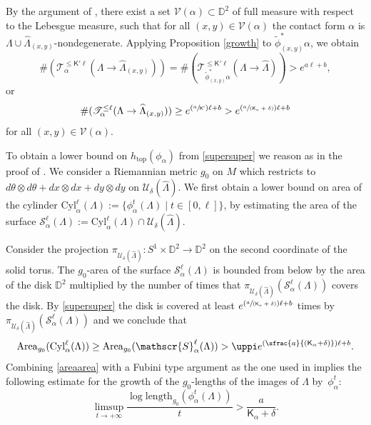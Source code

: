 \documentclass[10pt]{amsart}
\let\mathcal\mathscr
\let\ra\rightarrow
\newcommand{\length}{\mathrm{length}}
\renewcommand{\top}{\mathrm{top}}
\newcommand{\Pspfrac}[2]{(\sfrac{#1}{(#2)})}
\newcommand{\Psfrac}[2]{(\sfrac{#1}{#2})}
\theoremstyle{plain}
\theoremstyle{definition}
\numberwithin{equation}{subsection}
\begin{document}
By the argument of \cite[Lem.\,3]{Al}, there exist a set $\mathcal{V}(\alpha) \subset \mathbb{D}^2$ of full measure with respect to the Lebesgue measure, such that for all $(x,y) \in \mathcal{V}(\alpha)$ the contact form $\alpha$ is $\Lambda\cup\widehat{\Lambda}_{(x,y)}$-nondegenerate. Applying Proposition \ref{growth} to $\widetilde{\phi}_{(x,y)}^* \alpha$, we obtain
\begin{equation}
\#(\mathcal{T}^{\leq \mathsf{K}' \ell}_\alpha(\Lambda\ra \widehat{\Lambda}_{(x,y)})) = \#(\mathcal{T}^{\leq\mathsf{K}' \ell}_ {\widetilde{\phi}_{(x,y)}^*\alpha}(\Lambda\ra \widehat{\Lambda})) >e^{a\ell +b},
\end{equation}
or
\begin{equation} \label{supersuper}
\#(\mathcal{T}^{\leq \ell}_\alpha(\Lambda\ra \widehat{\Lambda}_{(x,y)})) \geq e^{\Psfrac{a}{\mathsf{K}'} \ell +b}> e^{\Pspfrac{a}{\mathsf{K}_{ \alpha} + \delta} \ell +b}
\end{equation}
for all $(x,y) \in \mathcal{V}(\alpha)$.

To obtain a lower bound on $h_{\top}(\phi_\alpha) $ from \eqref{supersuper} we reason as in the proof of \cite[Th.\,1]{Al}. We consider a Riemannian metric $g_0$ on $M$ which restricts to \hbox{$d\theta \otimes d\theta + dx \otimes dx + dy \otimes dy$} on $\mathcal{U}_\delta(\widehat{\Lambda})$. We first obtain a lower bound on area of the cylinder $\mathrm{Cyl}_\alpha^\ell(\Lambda):=\{\phi^t_\alpha(\Lambda) \mid t \in [0,\ell]\}$, by estimating the area of the surface $ \mathcal{S}_\alpha^\ell(\Lambda) :=\mathrm{Cyl}_\alpha^\ell(\Lambda) \cap \mathcal{U}_\delta(\widehat{\Lambda})$.

Consider the projection $\pi_{\mathcal{U}_\delta(\widehat{\Lambda})}: S^1 \times \mathbb{D}^2 \to \mathbb{D}^2$ on the second coordinate of the solid torus.
The $g_0$-area of the surface $\mathcal{S}_\alpha^\ell(\Lambda)$ is bounded from below by the area of the disk $\mathbb{D}^2$ multiplied by the number of times that $\pi_{\mathcal{U}_\delta(\widehat{\Lambda})}(\mathcal{S}_\alpha^\ell(\Lambda))$ covers the disk. By \eqref{supersuper} the disk is covered at least $e^{\Pspfrac{a}{\mathsf{K}_{ \alpha} + \delta} \ell +b}$ times by $\pi_{\mathcal{U}_\delta(\widehat{\Lambda})}(\mathcal{S}_\alpha^\ell(\Lambda))$ and we conclude that
\begin{equation} \label{areaarea}
\mathrm{Area}_{g_0}(\mathrm{Cyl}_\alpha^\ell(\Lambda)) \geq \mathrm{Area}_{g_0}(\mathcal{S}_\alpha^\ell(\Lambda)) > \uppi e^{\Pspfrac{a}{\mathsf{K}_{ \alpha} + \delta} \ell +b}.
\end{equation}
Combining \eqref{areaarea} with a Fubini type argument as the one used in \cite[Th.\,1]{Al} implies the following estimate for the growth of the $g_0$-lengths of the images of $\Lambda$ by~$\phi^t_\alpha$:
\begin{equation}%
\limsup_{t\to +\infty }\frac{\log\length_{g_0}(\phi^t_\alpha(\Lambda))}{t} > \frac{a}{\mathsf{K}_\alpha + \delta}.
\end{equation}
\end{document}
